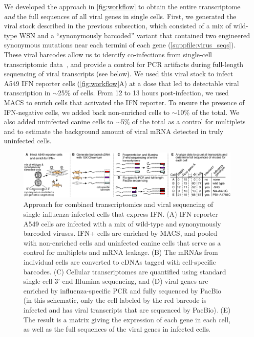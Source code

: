 \documentclass[lineno]{asm-article}
\newcommand{\FIG}[1]{\autoref{fig:#1}}
\newcommand{\SUPPFILE}[1]{\autoref{suppfile:#1}}
\begin{document}
We developed the approach in \FIG{workflow} to obtain the entire transcriptome \emph{and} the full sequences of all viral genes in single cells.
First, we generated the viral stock described in the previous subsection, which consisted of a mix of wild-type WSN and a ``synonymously barcoded'' variant that contained two engineered synonymous mutations near each termini of each gene (\SUPPFILE{virus_seqs}).
These viral barcodes allow us to identify co-infections from single-cell transcriptomic data~\cite{russell2018extreme}, and provide a control for PCR artifacts during full-length sequencing of viral transcripts (see below).
We used this viral stock to infect A549 IFN reporter cells (\FIG{workflow}A) at a dose that led to detectable viral transcription in $\sim$25\% of cells.
From 12 to 13 hours post-infection, we used MACS to enrich cells that activated the IFN reporter.
To ensure the presence of IFN-negative cells, we added back non-enriched cells to $\sim$10\% of the total.
We also added uninfected canine cells to $\sim$5\% of the total as a control for multiplets and to estimate the background amount of viral mRNA detected in truly uninfected cells.

\begin{figure}
\begin{fullwidth}

\includegraphics[width=\linewidth, valign=t]{figures/WorkflowSchematic/SchematicForPaper.pdf}

\caption{
Approach for combined transcriptomics and viral sequencing of single influenza-infected cells that express IFN.
(A)
IFN reporter A549 cells are infected with a mix of wild-type and synonymously barcoded viruses.
IFN+ cells are enriched by MACS, and pooled with non-enriched cells and uninfected canine cells that serve as a control for multiplets and mRNA leakage.
(B)
The mRNAs from individual cells are converted to cDNAs tagged with cell-specific barcodes.
(C)
Cellular transcriptomes are quantified using standard single-cell 3'-end Illumina sequencing, and 
(D)
viral genes are enriched by influenza-specific PCR and fully sequenced by PacBio (in this schematic, only the cell labeled by the red barcode is infected and has viral transcripts that are sequenced by PacBio).
(E)
The result is a matrix giving the expression of each gene in each cell, as well as the full sequences of the viral genes in infected cells.
}
\label{fig:workflow}

\end{fullwidth}
\end{figure}
\end{document}
